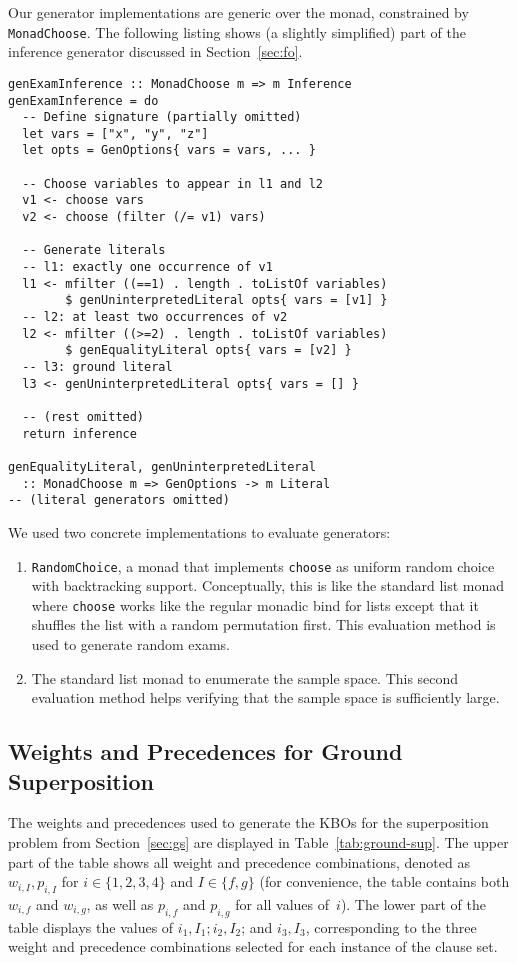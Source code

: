 Our generator implementations are generic over the monad, constrained by \texttt{MonadChoose}.
The following listing shows (a slightly simplified) part of the inference generator
discussed in Section~\ref{sec:fo}.
\begin{lstlisting}
genExamInference :: MonadChoose m => m Inference
genExamInference = do
  -- Define signature (partially omitted)
  let vars = ["x", "y", "z"]
  let opts = GenOptions{ vars = vars, ... }

  -- Choose variables to appear in l1 and l2
  v1 <- choose vars
  v2 <- choose (filter (/= v1) vars)

  -- Generate literals
  -- l1: exactly one occurrence of v1
  l1 <- mfilter ((==1) . length . toListOf variables)
        $ genUninterpretedLiteral opts{ vars = [v1] }
  -- l2: at least two occurrences of v2
  l2 <- mfilter ((>=2) . length . toListOf variables)
        $ genEqualityLiteral opts{ vars = [v2] }
  -- l3: ground literal
  l3 <- genUninterpretedLiteral opts{ vars = [] }

  -- (rest omitted)
  return inference

genEqualityLiteral, genUninterpretedLiteral
  :: MonadChoose m => GenOptions -> m Literal
-- (literal generators omitted)
\end{lstlisting}

We used two concrete implementations to evaluate generators:
\begin{enumerate}
    \item
        \texttt{RandomChoice}, a monad that implements \texttt{choose}
        as uniform random choice with backtracking support.
        Conceptually, this is like the standard list monad
        where \texttt{choose} works like the regular monadic bind for lists
        except that it shuffles the list with a random permutation first.
        This evaluation method is used to generate random exams.
    \item
        The standard list monad to enumerate the sample space.
        This second evaluation method helps verifying that the sample space is sufficiently large.
\end{enumerate}

\subsection{Weights and Precedences for Ground Superposition}\label{appB:FO}

The weights and precedences used to generate the KBOs for the superposition problem
from Section~\ref{sec:gs}
are displayed in Table~\ref{tab:ground-sup}.
The upper part of the table shows all weight and precedence combinations,
denoted as $w_{i, I}, p_{i, I}$ for $i \in \{1, 2, 3, 4\}$
and $I \in \{f, g\}$ (for convenience, the table contains both $w_{i, f}$
and $w_{i, g}$, as well as $p_{i, f}$ and $p_{i, g}$ for all values of~$i$).
The lower part of the table displays the values of $i_1, I_1; i_2, I_2$; and $i_3, I_3$,
corresponding to the three weight and precedence combinations selected for
each instance of the clause set.

